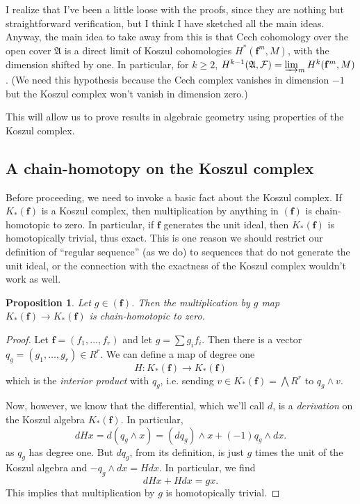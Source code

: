 \documentclass{article}
\newtheorem{proposition}{Proposition}
\begin{document}
I realize that I've been a little loose with the proofs, since they are nothing
but straightforward verification, but I think I have sketched all the main
ideas. Anyway, the main idea to take away from this is that Cech cohomology
over the open cover $\mathfrak{A}$ is
a direct limit of Koszul cohomologies $H^*(\mathbf{f}^m, M)$, with the
dimension shifted by one. In particular, for $k \geq 2$, $H^{k-1}(\mathfrak{A}, \mathcal{F}) =
\varinjlim_m H^{k}(\mathbf{f}^m, M)$. (We need this hypothesis because the Cech
complex vanishes in dimension $-1$ but the Koszul complex won't vanish in
dimension zero.)

This will allow us to prove results in algebraic geometry using properties of
the Koszul complex.

\subsection{A chain-homotopy on the Koszul complex}

Before proceeding, we need to invoke a basic fact about the Koszul complex. If
$K_*(\mathbf{f})$ is a Koszul complex, then multiplication by anything in
$(\mathbf{f})$ is chain-homotopic to zero.
In particular, if $\mathbf{f}$ generates the unit ideal, then $K_*(\mathbf{f})$
is homotopically trivial, thus exact.
This is one reason we should restrict our definition of ``regular sequence''
(as we do) to sequences that do not generate the unit ideal, or the connection
with the exactness of the Koszul complex wouldn't work as well.

\begin{proposition} 
Let $g \in (\mathbf{f})$. Then the multiplication by $g$ map $K_*(\mathbf{f})
\to K_*(\mathbf{f})$ is chain-homotopic to zero.
\end{proposition} 
\begin{proof} 
Let $\mathbf{f} = (f_1, \dots, f_r)$ and let $g = \sum g_i f_i$. Then there is
a vector $q_g = (g_1, \dots, g_r) \in R^r$. We can define a map of degree one 
\[ H: K_*(\mathbf{f}) \to K_*(\mathbf{f})  \]
which is the \emph{interior product} with $q_g$, i.e. sending $v \in
K_*(\mathbf{f}) = \bigwedge R^r$ to $q_g \wedge v$. 

Now, however, we know that the differential, which we'll call $d$, is a \emph{derivation} on the
Koszul algebra $K_*(\mathbf{f})$. In particular,
\[ d Hx  = d (q_g \wedge x) =( d q_g) \wedge x + (-1) q_g \wedge dx .  \]
as $q_g$ has degree one.
But $dq_g$, from its definition, is just $g$ times the unit of the Koszul algebra and $-q_g \wedge dx
= Hdx$. In particular, we find
\[ dHx + Hdx =  gx. \]
This implies that multiplication by $g$ is homotopically trivial.
\end{proof} 
\end{document}
